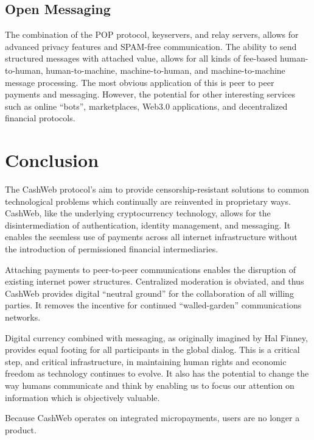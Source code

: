 \documentclass{article}
\begin{document}
\subsection{Open Messaging}

The combination of the POP protocol, keyservers, and relay servers, allows for advanced privacy features and SPAM-free communication. The ability to send structured messages with attached value, allows for all kinds of fee-based human-to-human, human-to-machine, machine-to-human, and machine-to-machine message processing. The most obvious application of this is peer to peer payments and messaging. However, the potential for other interesting services such as online ``bots'', marketplaces, Web3.0 applications, and decentralized financial protocols.

\section{Conclusion}

The CashWeb protocol's aim to provide censorship-resistant solutions to common technological problems which continually are reinvented in proprietary ways. CashWeb, like the underlying cryptocurrency technology, allows for the disintermediation of authentication, identity management, and messaging. It enables the seemless use of payments across all internet infrastructure without the introduction of permissioned financial intermediaries.

Attaching payments to peer-to-peer communications enables the disruption of existing internet power structures. Centralized moderation is obviated, and thus CashWeb provides digital ``neutral ground'' for the collaboration of all willing parties. It removes the incentive for continued ``walled-garden'' communications networks.

Digital currency combined with messaging, as originally imagined by Hal Finney\cite{finney2004rpow}, provides equal footing for all participants in the global dialog. This is a critical step, and critical infrastructure, in maintaining human rights and economic freedom as technology continues to evolve. It also has the potential to change the way humans communicate and think by enabling us to focus our attention on information which is objectively valuable.

Because CashWeb operates on integrated micropayments, users are no longer a product.



\end{document}
